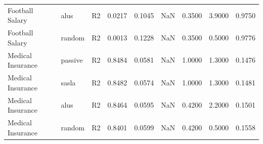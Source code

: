 \begin{table}
\begin{tabular}{lllrrrrrr}
Football Salary & alus & R2 & 0.0217 & 0.1045 & NaN & 0.3500 & 3.9000 & 0.9750 \\
Football Salary & random & R2 & 0.0013 & 0.1228 & NaN & 0.3500 & 0.5000 & 0.9776 \\
Medical Insurance & passive & R2 & 0.8484 & 0.0581 & NaN & 1.0000 & 1.3000 & 0.1476 \\
Medical Insurance & sasla & R2 & 0.8482 & 0.0574 & NaN & 1.0000 & 1.3000 & 0.1481 \\
Medical Insurance & alus & R2 & 0.8464 & 0.0595 & NaN & 0.4200 & 2.2000 & 0.1501 \\
Medical Insurance & random & R2 & 0.8401 & 0.0599 & NaN & 0.4200 & 0.5000 & 0.1558 \\
\bottomrule
\end{tabular}
\end{table}
